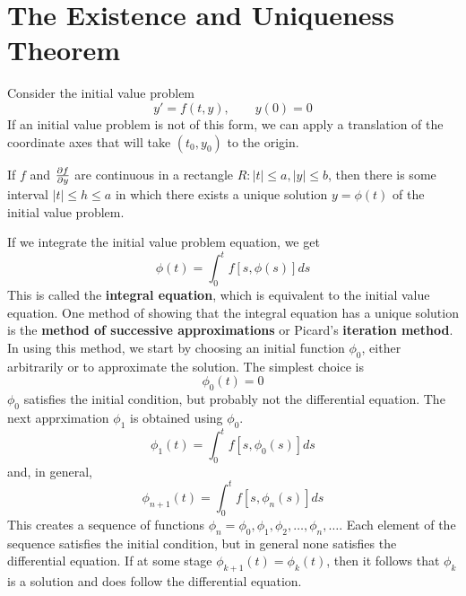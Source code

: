 \section{The Existence and Uniqueness Theorem}
    Consider the initial value problem
    \begin{equation*}
        y' = f(t, y), \qquad y(0) = 0
    \end{equation*}
    If an initial value problem is not of this form, we can apply a translation of the coordinate axes that will take $(t_0, y_0)$ to the origin.
    \begin{theorem}
        If $f$ and $\pdv{f}{y}$ are continuous in a rectangle $R: |t| \leq a, |y| \leq b$, then there is some interval $|t| \leq h \leq a$ in which there exists a unique solution $y = \phi(t)$ of the initial value problem.
    \end{theorem}
    If we integrate the initial value problem equation, we get
    \begin{equation*}
        \phi(t) = \int_0^t f[s, \phi(s)] ds
    \end{equation*}
    This is called the \textbf{integral equation}, which is equivalent to the initial value equation.
    \newline \indent
    One method of showing that the integral equation has a unique solution is the \textbf{method of successive approximations} or Picard's \textbf{iteration method}. In using this method, we start by choosing an initial function $\phi_0$, either arbitrarily or to approximate the solution. The simplest choice is $$\phi_0(t) = 0$$ $\phi_0$ satisfies the initial condition, but probably not the differential equation. The next apprximation $\phi_1$ is obtained using $\phi_0$.
    \begin{equation*}
        \phi_1(t) = \int_0^t f[s, \phi_0(s)] ds
    \end{equation*}
    and, in general,
    \begin{equation*}
        \phi_{n+1}(t) = \int_0^t f[s, \phi_n(s)] ds
    \end{equation*}
    This creates a sequence of functions ${\phi_n}= {\phi_0, \phi_1, \phi_2, \dots, \phi_n, \dots}$. Each element of the sequence satisfies the initial condition, but in general none satisfies the differential equation. If at some stage $\phi_{k+1}(t) = \phi_k(t)$, then it follows that $\phi_k$ is a solution and does follow the differential equation.
